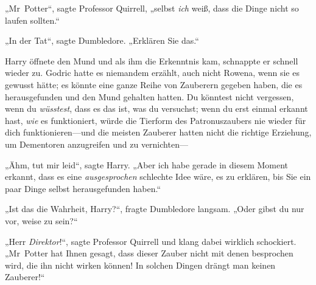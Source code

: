 „Mr~Potter“, sagte Professor Quirrell, „selbst \emph{ich} weiß, dass die Dinge nicht so laufen sollten.“

„In der Tat“, sagte Dumbledore. „Erklären Sie das.“

Harry öffnete den Mund und als ihm die Erkenntnis kam, schnappte er schnell wieder zu. Godric hatte es niemandem erzählt, auch nicht Rowena, wenn sie es gewusst hätte; es könnte eine ganze Reihe von Zauberern gegeben haben, die es herausgefunden und den Mund gehalten hatten. Du könntest nicht vergessen, wenn du \emph{wüsstest}, dass es das ist, was du versuchst; wenn du erst einmal erkannt hast, \emph{wie} es funktioniert, würde die Tierform des Patronuszaubers nie wieder für dich funktionieren—und die meisten Zauberer hatten nicht die richtige Erziehung, um Dementoren anzugreifen und zu vernichten—

„Ähm, tut mir leid“, sagte Harry. „Aber ich habe gerade in diesem Moment erkannt, dass es eine \emph{ausgesprochen} schlechte Idee wäre, es zu erklären, bis Sie ein paar Dinge selbst herausgefunden haben.“

„Ist das die Wahrheit, Harry?“, fragte Dumbledore langsam. „Oder gibst du nur vor, weise zu sein?“

„Herr \emph{Direktor}!“, sagte Professor Quirrell und klang dabei wirklich schockiert. „Mr~Potter hat Ihnen gesagt, dass dieser Zauber nicht mit denen besprochen wird, die ihn nicht wirken können! In solchen Dingen drängt man keinen Zauberer!“

